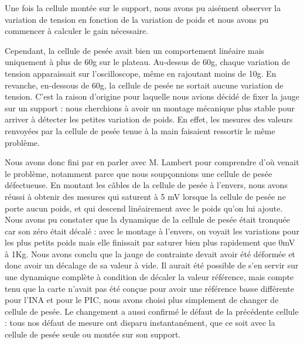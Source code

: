 \documentclass[a4paper,11pt,titlepage]{article}
\begin{document}
Une fois la cellule montée sur le support, nous avons pu aisément observer la variation de tension en fonction de la variation de poids et nous avons pu commencer à calculer le gain nécessaire.

Cependant, la cellule de pesée avait bien un comportement linéaire mais uniquement à plus de 60g sur le plateau. Au-dessus de 60g, chaque variation de tension apparaissait sur l'oscilloscope, même en rajoutant moins de 10g. En revanche, en-dessous de 60g, la cellule de pesée ne sortait aucune variation de tension. C'est la raison d'origine pour laquelle nous avions décidé de fixer la jauge sur un support : nous cherchions à avoir un montage mécanique plus stable pour arriver à détecter les petites variation de poids. En effet, les mesures des valeurs renvoyées par la cellule de pesée tenue à la main faisaient ressortir le même problème.

Nous avons donc fini par en parler avec M. Lambert pour comprendre d'où venait le problème, notamment parce que nous soupçonnions une cellule de pesée défectueuse.
En montant les câbles de la cellule de pesée à l'envers, nous avons réussi à obtenir des mesures qui saturent à 5 mV lorsque la cellule de pesée ne porte aucun poids, et qui descend linéairement avec le poids qu'on lui ajoute. Nous avons pu constater que la dynamique de la cellule de pesée était tronquée car son zéro était décalé : avec le montage à l'envers, on voyait les variations pour les plus petits poids mais elle finissait par saturer bien plus rapidement que 0mV à 1Kg. Nous avons conclu que la jauge de contrainte devait avoir été déformée et donc avoir un décalage de sa valeur à vide. Il aurait été possible de s'en servir sur une dynamique complète à condition de décaler la valeur référence, mais compte tenu que la carte n'avait pas été conçue pour avoir une référence basse différente pour l'INA et pour le PIC, nous avons choisi plus simplement de changer de cellule de pesée.
Le changement a aussi confirmé le défaut de la précédente cellule : tous nos défaut de mesure ont disparu instantanément, que ce soit avec la cellule de pesée seule ou montée sur son support.
\end{document}
